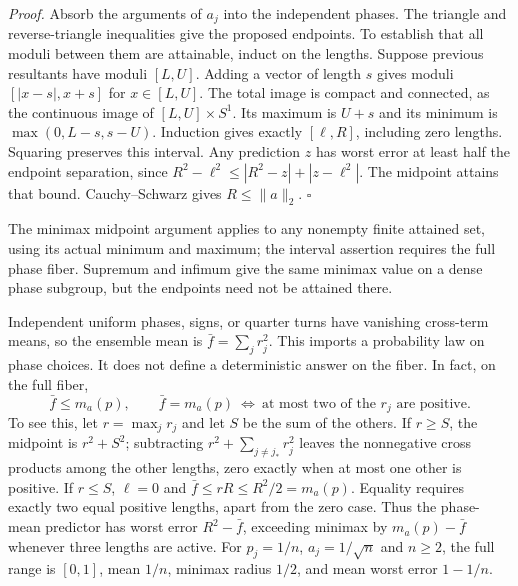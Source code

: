 \documentclass[
  11pt,
]{article}
\begin{document}
\emph{Proof.} Absorb the arguments of \(a_j\) into the independent phases. The
triangle and reverse-triangle inequalities give the proposed endpoints. To
establish that all moduli between them are attainable, induct on the lengths. Suppose
previous resultants have moduli \([L,U]\). Adding a vector of length \(s\) gives
moduli \([|x-s|,x+s]\) for \(x\in[L,U]\). The total image is compact and connected,
as the continuous image of \([L,U]\times S^1\). Its maximum is \(U+s\) and its
minimum is \(\max(0,L-s,s-U)\). Induction gives exactly \([\ell,R]\), including
zero lengths. Squaring preserves this interval. Any prediction \(z\) has
worst error at least half the endpoint separation, since
\(R^2-\ell^2\le|R^2-z|+|z-\ell^2|\). The midpoint attains that bound.
Cauchy--Schwarz gives \(R\le\lVert a\rVert_2\). \(\square\)

The minimax midpoint argument applies to any nonempty finite attained set,
using its actual minimum and maximum; the interval assertion requires the
full phase fiber. Supremum and infimum give the same minimax value on a dense
phase subgroup, but the endpoints need not be attained there.

Independent uniform phases, signs, or quarter turns have vanishing cross-term
means, so the ensemble mean is \(\bar f=\sum_jr_j^2\). This imports a probability
law on phase choices. It does not define a deterministic answer on the fiber.
In fact, on the full fiber,
\[
\bar f\le m_a(p),
\qquad \bar f=m_a(p)\ \Longleftrightarrow\
              \text{at most two of the }r_j\text{ are positive}.
\]
To see this, let \(r=\max_jr_j\) and let \(S\) be the sum of the others. If
\(r\ge S\), the midpoint is \(r^2+S^2\); subtracting
\(r^2+\sum_{j\ne j_*}r_j^2\) leaves the nonnegative cross products among the
other lengths, zero exactly when at most one other is positive. If \(r\le S\),
\(\ell=0\) and
\(\bar f\le rR\le R^2/2=m_a(p)\). Equality requires exactly two equal positive
lengths, apart from the zero case. Thus the phase-mean predictor has worst
error \(R^2-\bar f\), exceeding minimax by \(m_a(p)-\bar f\) whenever three
lengths are active. For \(p_j=1/n\), \(a_j=1/\sqrt n\) and \(n\ge2\), the full
range is \([0,1]\), mean \(1/n\), minimax radius \(1/2\), and mean worst error
\(1-1/n\).
\end{document}
